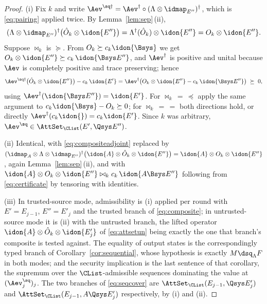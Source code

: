 \begin{proof}
(i) Fix $k$ and write $\Aev^{\sq\dagger}
=\Aev^{\dagger}\circ(\Lambda\otimes\idmap_{E''})^{\dagger}$, which is
\eqref{eq:pairing} applied twice. By Lemma~\ref{lem:sep}\,(ii),
\begin{equation}\label{eq:compositeadjoint}
  (\Lambda\otimes\idmap_{E''})^{\dagger}
  \big(\hat O_k\otimes\idon{E''}\big)
  =\Lambda^{\dagger}(\hat O_k)\otimes\idon{E''}
  =O_k\otimes\idon{E''} .
\end{equation}
Suppose $\bowtie_k$ is $\succeq$. From $O_k\succeq c_k\idon{\Bsys}$ we get
$O_k\otimes\idon{E''}\succeq c_k\,\idon{\Bsys E''}$, and $\Aev^{\dagger}$ is
positive and unital because $\Aev$ is completely positive and trace preserving;
hence
\begin{equation*}
  \Aev^{\sq\dagger}\big(\hat O_k\otimes\idon{E''}\big)-c_k\,\idon{E'}
  =\Aev^{\dagger}\big(O_k\otimes\idon{E''}-c_k\,\idon{\Bsys E''}\big)
  \;\succeq\;0 ,
\end{equation*}
using $\Aev^{\dagger}(\idon{\Bsys E''})=\idon{E'}$. For
$\bowtie_k\,=\,\preceq$ apply the same argument to
$c_k\idon{\Bsys}-O_k\succeq0$; for $\bowtie_k\,=\,=$ both directions hold, or
directly $\Aev^{\dagger}(c_k\idon{})=c_k\idon{E'}$. Since $k$ was arbitrary,
$\Aev^{\sq}\in\AttSet_{\CList}(E',\Qsys E'')$.

(ii) Identical, with \eqref{eq:compositeadjoint} replaced by
$(\idmap_A\otimes\Lambda\otimes\idmap_{E''})^{\dagger}
\big(\idon{A}\otimes\hat O_k\otimes\idon{E''}\big)
=\idon{A}\otimes O_k\otimes\idon{E''}$, again Lemma~\ref{lem:sep}\,(ii), and
with $\idon{A}\otimes O_k\otimes\idon{E''}\bowtie_k c_k\,\idon{A\Bsys E''}$
following from \eqref{eq:certificate} by tensoring with identities.

(iii) In trusted-source mode, admissibility is (i) applied per round with
$E'=E_{j-1}$, $E''=E'_j$ and the trusted branch of \eqref{eq:composite}; in
untrusted-source mode it is (ii) with the untrusted branch, the lifted operator
$\idon{A}\otimes\hat O_k\otimes\idon{E'_j}$ of \eqref{eq:attsetun} being
exactly the one that branch's composite is tested against. The equality of
output states is the correspondingly typed branch of
Corollary~\ref{cor:sequential}, whose hypothesis is exactly $M\dsq_{\Lambda}F$
in both modes; and the security implication is the last sentence of that
corollary, the supremum over the $\CList$-admissible sequences dominating the
value at $(\Aev^{\sq}_j)_j$. The two branches of \eqref{eq:seqcover} are
$\AttSet_{\CList}(E_{j-1},\Qsys E'_j)$ and
$\AttSet_{\CList}(E_{j-1},A\Qsys E'_j)$ respectively, by (i) and (ii).


\end{proof}
